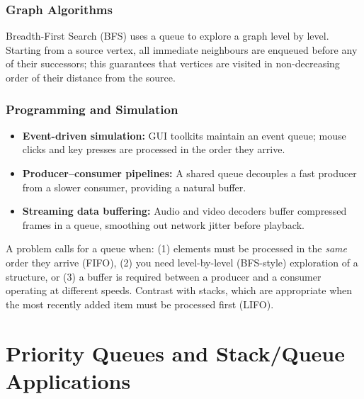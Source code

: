 \documentclass[11pt, a4paper, notitlepage]{report}
\theoremstyle{definition}
\theoremstyle{remark}
\theoremstyle{definition}
\begin{document}
\subsection{Graph Algorithms}
\label{subsec:queue-bfs}

Breadth-First Search (BFS) uses a queue to explore a graph level by level.  Starting from a
source vertex, all immediate neighbours are enqueued before any of their successors; this
guarantees that vertices are visited in non-decreasing order of their distance from the source.

\subsection{Programming and Simulation}
\label{subsec:queue-programming}

\begin{itemize}
  \item \textbf{Event-driven simulation:} GUI toolkits maintain an event queue; mouse clicks
        and key presses are processed in the order they arrive.
  \item \textbf{Producer--consumer pipelines:} A shared queue decouples a fast producer from
        a slower consumer, providing a natural buffer.
  \item \textbf{Streaming data buffering:} Audio and video decoders buffer compressed frames
        in a queue, smoothing out network jitter before playback.
\end{itemize}

\begin{examtip}[title={Exam Tip: Recognising Queue Problems}]
A problem calls for a queue when:
(1) elements must be processed in the \emph{same} order they arrive (FIFO),
(2) you need level-by-level (BFS-style) exploration of a structure, or
(3) a buffer is required between a producer and a consumer operating at different speeds.
Contrast with stacks, which are appropriate when the most recently added item must be processed
first (LIFO).
\end{examtip}

\chapter{Priority Queues and Stack/Queue Applications}
\label{ch:priority-queues-applications}

\end{document}
